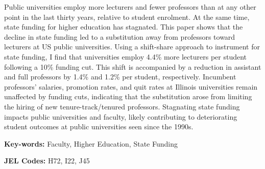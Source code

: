 Public universities employ more lecturers and fewer professors than at any other point in the last thirty years, relative to student enrolment.
At the same time, state funding for higher education has stagnated.
This paper shows that the decline in state funding led to a substitution away from professors toward lecturers at US public universities.
Using a shift-share approach to instrument for state funding, I find that universities employ 4.4\% more lecturers per student following a 10\% funding cut.
This shift is accompanied by a reduction in assistant and full professors by 1.4\% and 1.2\%  per student, respectively.
Incumbent professors' salaries, promotion rates, and quit rates at Illinois universities remain unaffected by funding cuts, indicating that the substitution arose from limiting the hiring of new tenure-track/tenured professors.
Stagnating state funding impacts public universities and faculty, likely contributing to deteriorating student outcomes at public universities seen since the 1990s.

\vfill
\noindent
\textbf{Key-words:}
Faculty,
Higher Education,
State Funding

\vspace{0.05cm}
\noindent
\textbf{JEL Codes:} H72, I22, J45
